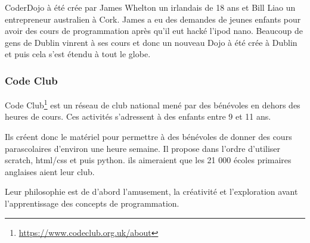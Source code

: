 CoderDojo à été crée par James Whelton un irlandais de 18 ans et Bill Liao un entrepreneur australien à Cork. James a eu des demandes de jeunes enfants pour avoir des cours de programmation après qu'il eut hacké l'ipod nano. Beaucoup de gens de Dublin vinrent à ses cours et donc un nouveau Dojo à été crée à Dublin et puis cela s'est étendu à tout le globe.

\subsubsection{Code Club}

Code Club\footnote{\url{https://www.codeclub.org.uk/about}} est un réseau de club national mené par des bénévoles en dehors des heures de cours. Ces activités s'adressent à des enfants entre 9 et 11 ans.

Ils créent donc le matériel pour permettre à des bénévoles de donner des cours parascolaires d'environ une heure semaine. Il propose dans l'ordre d'utiliser scratch, html/css et puis python. ils aimeraient que les 21 000 écoles primaires anglaises aient leur club.

Leur philosophie est de d'abord l'amusement, la créativité et l'exploration avant l'apprentissage des concepts de programmation.
